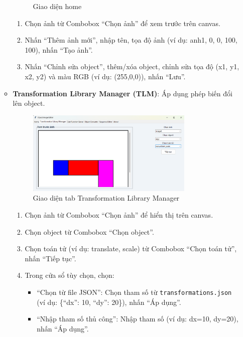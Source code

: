 \documentclass[a4paper,12pt]{article}
\begin{document}
\begin{enumerate}
\begin{itemize}
\begin{figure}[h]
    \caption{Giao diện home}
    \label{fig:home_tab}
\end{figure}
        \begin{enumerate}
            \item Chọn ảnh từ Combobox ``Chọn ảnh'' để xem trước trên canvas.
            \item Nhấn ``Thêm ảnh mới'', nhập tên, tọa độ ảnh (ví dụ: anh1, 0, 0, 100, 100), nhấn ``Tạo ảnh''.
            \item Nhấn ``Chỉnh sửa object'', thêm/xóa object, chỉnh sửa tọa độ (x1, y1, x2, y2) và màu RGB (ví dụ: (255,0,0)), nhấn ``Lưu''.
        \end{enumerate}
        \item \textbf{Transformation Library Manager (TLM)}: Áp dụng phép biến đổi lên object.
        \begin{figure}[H]
    \centering
    \includegraphics[width=0.8\textwidth]{TLM.png}
    \caption{Giao diện tab Transformation Library Manager}
    \label{fig:tlm_tab}
\end{figure}
        \begin{enumerate}
            \item Chọn ảnh từ Combobox ``Chọn ảnh'' để hiển thị trên canvas.
            \item Chọn object từ Combobox ``Chọn object''.
            \item Chọn toán tử (ví dụ: translate, scale) từ Combobox ``Chọn toán tử'', nhấn ``Tiếp tục''.
            \item Trong cửa sổ tùy chọn, chọn:
            \begin{itemize}
                \item ``Chọn từ file JSON'': Chọn tham số từ \texttt{transformations.json} (ví dụ: \{``dx'': 10, ``dy'': 20\}), nhấn ``Áp dụng''.
                \item ``Nhập tham số thủ công'': Nhập tham số (ví dụ: dx=10, dy=20), nhấn ``Áp dụng''.
            \end{itemize}

\end{enumerate}
\end{itemize}
\end{enumerate}
\end{document}

